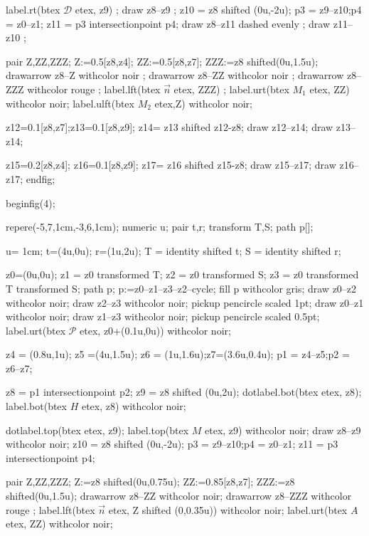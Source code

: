 \documentclass[12pt]{article}
\newcommand{\PR}{\mathscr{P}}
\newcommand{\DR}{\mathscr{D}}
\begin{document}
label.rt(btex $\DR$ etex, z9) ;
 draw z8--z9  ;
z10 = z8 shifted (0u,-2u);
p3 = z9--z10;p4 = z0--z1;
z11 = p3 intersectionpoint p4;
draw z8--z11 dashed evenly  ;
draw z11--z10  ;

pair Z,ZZ,ZZZ;
Z:=0.5[z8,z4];
ZZ:=0.5[z8,z7];
ZZZ:=z8 shifted(0u,1.5u);
drawarrow z8--Z withcolor noir ;
drawarrow z8--ZZ withcolor noir ;
drawarrow z8--ZZZ withcolor rouge ;
label.lft(btex $\overrightarrow{n}$ etex, ZZZ) ;
label.urt(btex $M_1$ etex, ZZ) withcolor noir;
label.ulft(btex $M_2$ etex,Z) withcolor noir;





z12=0.1[z8,z7];z13=0.1[z8,z9];
z14= z13 shifted z12-z8;
draw z12--z14;
draw z13--z14;

z15=0.2[z8,z4];
z16=0.1[z8,z9];
z17= z16 shifted z15-z8;
draw z15--z17;
draw z16--z17;
endfig;

beginfig(4);

 repere(-5,7,1cm,-3,6,1cm);
numeric u;
pair t,r;
transform T,S;
path p[];

u= 1cm;
t=(4u,0u); r=(1u,2u);
T = identity shifted t;
S = identity shifted r;

z0=(0u,0u);
z1 = z0 transformed T;
z2 = z0 transformed S;
 z3 = z0 transformed T transformed S;
 path p;
 p:=z0--z1--z3--z2--cycle;
 fill p withcolor gris;
 draw z0--z2 withcolor noir;
 draw z2--z3 withcolor noir;
 pickup pencircle scaled 1pt;
 draw z0--z1 withcolor noir;
 draw z1--z3 withcolor noir;
 pickup pencircle scaled 0.5pt;
 label.urt(btex $\PR$ etex, z0+(0.1u,0u)) withcolor noir;

 z4 = (0.8u,1u); z5 =(4u,1.5u);
 z6 = (1u,1.6u);z7=(3.6u,0.4u);
 p1 = z4--z5;p2 = z6--z7;

 z8 = p1 intersectionpoint p2;
 z9 = z8 shifted (0u,2u);
 dotlabel.bot(btex  etex, z8);
 label.bot(btex $H$ etex, z8) withcolor noir;

 dotlabel.top(btex  etex, z9);
 label.top(btex $M$ etex, z9) withcolor noir;
 draw z8--z9 withcolor noir;
 z10 = z8 shifted (0u,-2u);
 p3 = z9--z10;p4 = z0--z1;
 z11 = p3 intersectionpoint p4;

 pair Z,ZZ,ZZZ;
 Z:=z8 shifted(0u,0.75u);
 ZZ:=0.85[z8,z7];
 ZZZ:=z8 shifted(0u,1.5u);
 drawarrow z8--ZZ withcolor noir;
 drawarrow z8--ZZZ withcolor rouge ;
 label.lft(btex $\overrightarrow{n}$ etex, Z shifted (0,0.35u)) withcolor noir;
 label.urt(btex $A$ etex, ZZ) withcolor noir;
\end{document}
